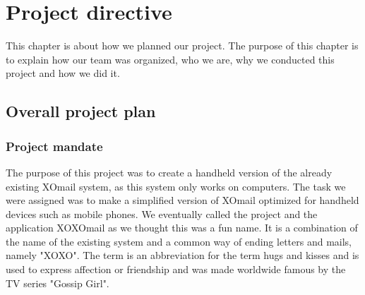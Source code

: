 \chapter{Project directive}

This chapter is about how we planned our project. The purpose of this chapter is to explain how our team was organized, who we are, why we conducted this project and how we did it.

\section{Overall project plan}

\subsection{Project mandate}
The purpose of this project was to create a handheld version of the already existing XOmail system, as this system only works on computers. The task we were assigned was to make a simplified version of XOmail optimized for handheld devices such as mobile phones.
\newline
\newline 
We eventually called the project and the application XOXOmail as we thought this was a fun name. It is a combination of the name of the existing system and a common way of ending letters and mails, namely "XOXO". The term is an abbreviation for the term hugs and kisses and is used to express affection or friendship and was made worldwide famous by the TV series "Gossip Girl".

